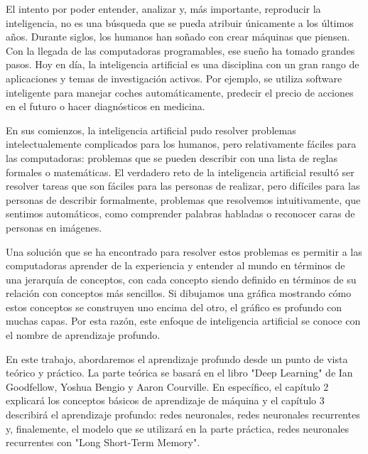\noindent
El intento por poder entender, analizar y, más importante, reproducir la inteligencia, no es una búsqueda que se pueda atribuir únicamente a los últimos años. Durante siglos, los humanos han soñado con crear máquinas que piensen. Con la llegada de las computadoras programables, ese sueño ha tomado grandes pasos. Hoy en día, la inteligencia artificial es una disciplina con un gran rango de aplicaciones y temas de investigación activos. Por ejemplo, se utiliza software inteligente para manejar coches automáticamente, predecir el precio de acciones en el futuro o hacer diagnósticos en medicina. \cite{goodfellow-et-al-2016}  \cite{hastie01statisticallearning}
\cite{Haugeland:1985:AIV:4694}

\vspace{1em}

En sus comienzos, la inteligencia artificial pudo resolver problemas intelectualemente complicados para los humanos, pero relativamente fáciles para las computadoras: problemas que se pueden describir con una lista de reglas formales o matemáticas. El verdadero reto de la inteligencia artificial resultó ser resolver tareas que son fáciles para las personas de realizar, pero difíciles para las personas de describir formalmente, problemas que resolvemos intuitivamente, que sentimos automáticos, como comprender palabras habladas o reconocer caras de personas en imágenes. 
\cite{goodfellow-et-al-2016}

\vspace{1em}

Una solución que se ha encontrado para resolver estos problemas es permitir a las computadoras aprender de la experiencia y entender al mundo en términos de una jerarquía de conceptos, con cada concepto siendo definido en términos de su relación con conceptos más sencillos. Si dibujamos una gráfica mostrando cómo estos conceptos se construyen uno encima del otro, el gráfico es profundo con muchas capas. Por esta razón, este enfoque de inteligencia artificial se conoce con el nombre de aprendizaje profundo. 
\cite{deep-learning-methods-and-applications}
\cite{goodfellow-et-al-2016}

\vspace{1em}

En este trabajo, abordaremos el aprendizaje profundo desde un punto de vista teórico y práctico. La parte teórica se basará en el libro "Deep Learning" de Ian Goodfellow, Yoshua Bengio y Aaron Courville. En específico, el capítulo 2 explicará los conceptos básicos de aprendizaje de máquina y el capítulo 3 describirá el aprendizaje profundo: redes neuronales, redes neuronales recurrentes y, finalemente, el modelo que se utilizará en la parte práctica, redes neuronales recurrentes con "Long Short-Term Memory".

